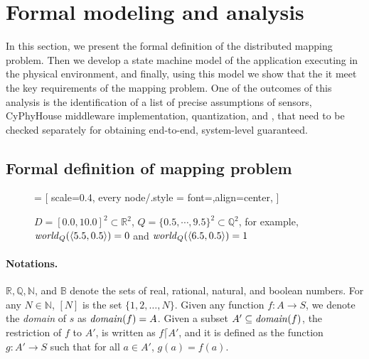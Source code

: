 \section{Formal modeling and analysis}
\label{sec:formal}
In this section, we present the formal definition of the distributed mapping problem. Then we develop a state machine model of the \dmap application executing in the physical environment, and finally, using this model we show that the it meet the key requirements of the mapping problem. One of the outcomes of this analysis is the identification of a list of precise
 assumptions of sensors, CyPhyHouse middleware implementation, quantization, and , that need to be checked separately for obtaining end-to-end, system-level guaranteed.

\subsection{Formal definition of mapping problem}
\label{sec:prelims}

\begin{figure*}[t]
\newcommand{\grid}[2]{\ensuremath{\langle#1,#2\rangle}}

 = [
scale=0.4,
every node/.style = {font=\scriptsize,align=center},
]




\caption{$D = [0.0,10.0]^2 \subset \mathbb{R}^2$, $Q=\{0.5, \cdots, 9.5\}^2 \subset \mathbb{Q}^2$, for example, $\world_Q(\grid{5.5}{0.5}) = 0$ and $\world_Q(\grid{6.5}{0.5}) = 1$}
\end{figure*}

\paragraph{Notations.}
$\mathbb{R}, \mathbb{Q},\mathbb{N}$, and $\mathbb{B}$ denote the sets of real, rational, natural, and boolean numbers.
For any $N \in \mathbb{N}$, $[N]$ is the set $\{1,2,\ldots,N\}$.
%
Given any function $f:A \rightarrow S$, we denote the {\em domain\/} of $s$ as $\mathit{domain}(f) = A$.
%
Given a subset $A' \subseteq \mathit{domain}(f)$, 
    the restriction of $f$ to $A'$, is written as $f \lceil A'$, and it is defined as the function $g:A' \rightarrow S$ such that for all $a \in A'$, $g(a) = f(a)$.

